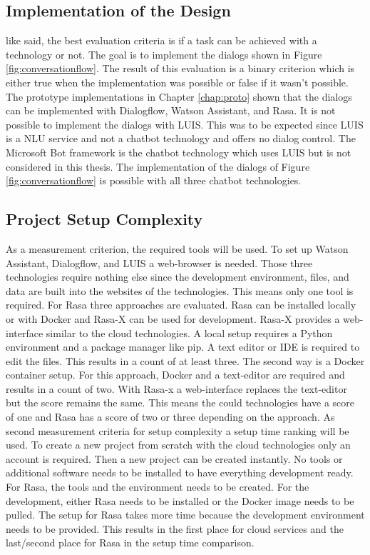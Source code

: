 \subsection*{Implementation of the Design}
like \citet{singhbuilding} said, the best evaluation criteria is if a task can be achieved with a technology or not.
The goal is to implement the dialogs shown in Figure \ref{fig:conversationflow}.
The result of this evaluation is a binary criterion which is either true when the implementation was possible or false
if it wasn't possible.
The prototype implementations in Chapter \ref{chap:proto} shown that the dialogs can be 
implemented with Dialogflow, Watson Assistant, and Rasa.
It is not possible to implement the dialogs with LUIS. 
This was to be expected since LUIS is a NLU service and not a chatbot technology and offers no dialog control.
The Microsoft Bot framework is the chatbot technology which uses LUIS but 
is not considered in this thesis.
The implementation of the dialogs of Figure \ref{fig:conversationflow} is possible with all 
three chatbot technologies.


\subsection*{Project Setup Complexity}
As a measurement criterion, the required tools will be used.
To set up Watson Assistant, Dialogflow, and LUIS a web-browser is needed.
Those three technologies require nothing else since the development environment,
files, and data are built into the websites of the technologies.
This means only one tool is required.
For Rasa three approaches are evaluated.
Rasa can be installed locally or with Docker and Rasa-X can be used for development.
Rasa-X provides a web-interface similar to the cloud technologies.
A local setup requires a Python environment and a package manager like pip.
A text editor or IDE is required to edit the files.
This results in a count of at least three.
The second way is a Docker container setup.
For this approach, Docker and a text-editor are required and results in a count of two.
With Rasa-x a web-interface replaces the text-editor but the score remains the same.
This means the could technologies have a score of one and Rasa has a score of two or three
depending on the approach.
As second measurement criteria for setup complexity a setup time ranking will be used.
To create a new project from scratch with the cloud technologies only an account is required.
Then a new project can be created instantly.
No tools or additional software needs to be installed to have everything development ready.
For Rasa, the tools and the environment needs to be created.
For the development, either Rasa needs to be installed or the Docker image needs to be pulled.
The setup for Rasa takes more time because the development environment needs to be provided.
This results in the first place for cloud services and the last/second place for Rasa in the
setup time comparison. 

